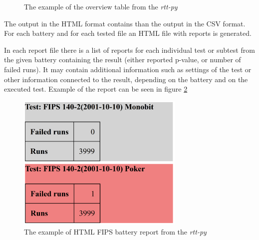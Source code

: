 \documentclass[
  digital,     %
  oneside,     %
  nosansbold,  %
  nocolorbold, %
  nolof,         %
  nolot,         %
]{fithesis4}
\begin{document}
\begin{figure}
  \begin{center}
  \end{center}
  \caption{The example of the overview table from the \emph{rtt-py}}
  \label{fig:rtt_py_table}
\end{figure}


The output in the HTML format contains than the output in the CSV format. For each battery and for each tested file an HTML file with reports is generated.

In each report file there is a list of reports for each individual test or subtest from the given battery containing the result (either reported p-value, or number of failed runs). It may contain additional information such as settings of the test or other information connected to the result, depending on the battery and on the executed test. Example of the  report can be seen in figure \ref{fig:rtt_py_html}
\begin{figure}
  \begin{center}
    \includegraphics[width=8cm]{figures/rtt-py.png}
  \end{center}
  \caption{The example of HTML FIPS battery report from the \emph{rtt-py}}
  \label{fig:rtt_py_html}
\end{figure}
\end{document}

